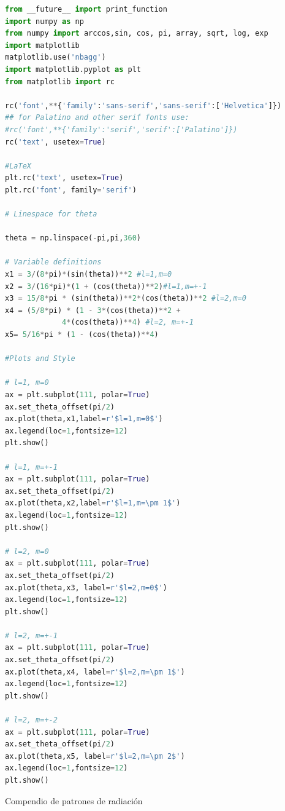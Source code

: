 \documentclass[a4paper,11pt]{article}
\numberwithin{equation}{section}
\begin{document}
\begin{lstlisting}[language=Python]
from __future__ import print_function
import numpy as np
from numpy import arccos,sin, cos, pi, array, sqrt, log, exp
import matplotlib
matplotlib.use('nbagg')
import matplotlib.pyplot as plt
from matplotlib import rc

rc('font',**{'family':'sans-serif','sans-serif':['Helvetica']})
## for Palatino and other serif fonts use:
#rc('font',**{'family':'serif','serif':['Palatino']})
rc('text', usetex=True)

#LaTeX
plt.rc('text', usetex=True)
plt.rc('font', family='serif')

# Linespace for theta

theta = np.linspace(-pi,pi,360)

# Variable definitions
x1 = 3/(8*pi)*(sin(theta))**2 #l=1,m=0
x2 = 3/(16*pi)*(1 + (cos(theta))**2)#l=1,m=+-1
x3 = 15/8*pi * (sin(theta))**2*(cos(theta))**2 #l=2,m=0
x4 = (5/8*pi) * (1 - 3*(cos(theta))**2 + 
             4*(cos(theta))**4) #l=2, m=+-1
x5= 5/16*pi * (1 - (cos(theta))**4)

#Plots and Style

# l=1, m=0
ax = plt.subplot(111, polar=True)
ax.set_theta_offset(pi/2)
ax.plot(theta,x1,label=r'$l=1,m=0$')
ax.legend(loc=1,fontsize=12)
plt.show()

# l=1, m=+-1 
ax = plt.subplot(111, polar=True)
ax.set_theta_offset(pi/2)
ax.plot(theta,x2,label=r'$l=1,m=\pm 1$')
ax.legend(loc=1,fontsize=12)
plt.show()

# l=2, m=0
ax = plt.subplot(111, polar=True)
ax.set_theta_offset(pi/2)
ax.plot(theta,x3, label=r'$l=2,m=0$')
ax.legend(loc=1,fontsize=12)
plt.show()

# l=2, m=+-1
ax = plt.subplot(111, polar=True)
ax.set_theta_offset(pi/2)
ax.plot(theta,x4, label=r'$l=2,m=\pm 1$')
ax.legend(loc=1,fontsize=12)
plt.show()

# l=2, m=+-2
ax = plt.subplot(111, polar=True)
ax.set_theta_offset(pi/2)
ax.plot(theta,x5, label=r'$l=2,m=\pm 2$')
ax.legend(loc=1,fontsize=12)
plt.show()
\end{lstlisting}

Compendio de patrones de radiación
\end{document}
